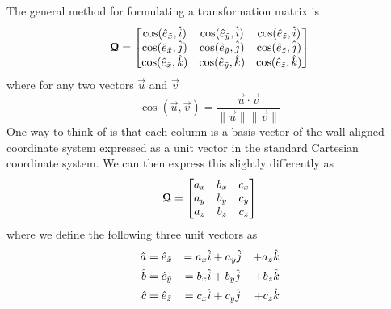 \begin{itemize}[parsep=2.5\parsep]

    The general method for formulating a transformation matrix is
    \begin{equation*}
      \bm{\mathcal{Q}} = 
      \begin{bmatrix}
        \cos(\hat{e}_{\tilde{x}},\hat{i}) & \cos(\hat{e}_{\tilde{y}},\hat{i}) & \cos(\hat{e}_{\tilde{z}},\hat{i})\\
        \cos(\hat{e}_{\tilde{x}},\hat{j}) & \cos(\hat{e}_{\tilde{y}},\hat{j}) & \cos(\hat{e}_{\tilde{z}},\hat{j})\\
        \cos(\hat{e}_{\tilde{x}},\hat{k}) & \cos(\hat{e}_{\tilde{y}},\hat{k}) & \cos(\hat{e}_{\tilde{z}},\hat{k})
      \end{bmatrix}
    \end{equation*}
    where for any two vectors \(\vec{u}\) and \(\vec{v}\)
    \begin{equation*}
      \cos\left(\vec{u},\vec{v}\right)=
          \frac{\vec{u}\cdot\vec{v}}{\|\vec{u}\| \|\vec{v}\|}
    \end{equation*}
    One way to think of \rmat{} is that each column is a basis vector of the
    wall-aligned coordinate system expressed as a unit vector in the standard
    Cartesian coordinate system.
    We can then express this slightly differently as
    \begin{equation*}
      \bm{\mathcal{Q}} = 
      \begin{bmatrix}
        a_x & b_x & c_x \\
        a_y & b_y & c_y \\
        a_z & b_z & c_z
      \end{bmatrix}
    \end{equation*}
    where we define the following three unit vectors as
    \begin{alignat*}{5}
      \hat{a} & = \hat{e}_{\tilde{x}} & = a_x\hat{i} & + a_y\hat{j} & + a_z\hat{k} \\
      \hat{b} & = \hat{e}_{\tilde{y}} & = b_x\hat{i} & + b_y\hat{j} & + b_z\hat{k} \\
      \hat{c} & = \hat{e}_{\tilde{z}} & = c_x\hat{i} & + c_y\hat{j} & + c_z\hat{k}
    \end{alignat*}



\end{itemize}
